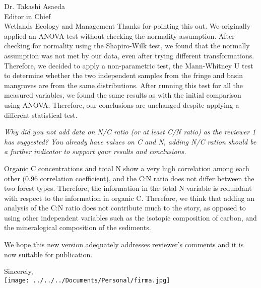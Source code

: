 \documentclass[11pt]{bgcletter}
\begin{document}
\begin{letter}{Dr. Takashi Asaeda\\
 Editor in Chief \\ Wetlands Ecology and Management}
{\color{blue} Thanks for pointing this out. We originally applied an ANOVA test without checking the normality assumption. After checking for normality using the Shapiro-Wilk test, we found that the normally assumption was not met by our data, even after trying different transformations. Therefore, we decided to apply a non-parametric test, the Mann-Whitney U test to determine whether the two independent samples from the fringe and basin mangroves are from the same distributions. After running this test for all the measured variables, we found the same results as with the initial comparison using ANOVA. Therefore, our conclusions are unchanged despite applying a different statistical test. }

{\it Why did you not add data on N/C ratio (or at least C/N ratio) as the reviewer 1 has suggested? You already have values on C and N, adding N/C ration should be a further indicator to support your results and conclusions.}

{\color{blue} Organic C concentrations and total N show a very high correlation among each other (0.96 correlation coefficient), and the C:N ratio does not differ between the two forest types. Therefore, the information in the total N variable is redundant with respect to the information in organic C. Therefore, we think that adding an analysis of the C:N ratio does not contribute much to the story, as opposed to using other independent variables such as the isotopic composition of carbon, and the mineralogical composition of the sediments. }


\vspace{2em}
We hope this new version adequately addresses reviewer's comments and it is now suitable for publication.

\closing{Sincerely, \\
 \texttt{[image: ../../../Documents/Personal/firma.jpg]}
 }
 \end{letter}

 
\end{document}
